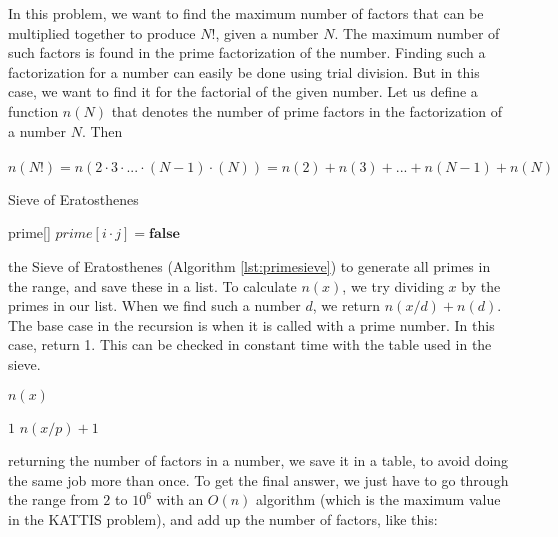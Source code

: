 \documentclass[11pt,a4paper,twoside]{article}
\begin{document}
In this problem, we want to find the maximum number of factors that can be
multiplied together to produce $N!$, given a number $N$.  The maximum number of
such factors is found in the prime factorization of the number. Finding such a
factorization for a number can easily be done using trial division. But in this
case, we want to find it for the factorial of the given number.  Let us define
a function $n(N)$ that denotes the number of prime factors in the factorization
of a number $N$. Then
\\\\
$n(N!) = n(2 \cdot 3 \cdot ... \cdot (N-1) \cdot (N)) = n(2) + n(3) + ... + n(N-1) + n(N)$
\\
\begin{algorithm}
    \caption{Sieve of Eratosthenes}
    \label{lst:primesieve}
    \begin{algorithmic}
        \STATE prime[] 
                    \STATE $prime[i \cdot j] = \textbf{false}$
                \ENDFOR
            \ENDIF
        \ENDFOR
    \end{algorithmic}
\end{algorithm}
            
 the Sieve of Eratosthenes (Algorithm \ref{lst:primesieve}) to
generate all primes in the range, and save these in a list. To calculate
$n(x)$, we try dividing $x$ by the primes in our list. When we find such a
number $d$, we return $n(x/d) + n(d)$. The base case in the recursion is when
it is called with a prime number. In this case, return 1.  This can be checked
in constant time with the table used in the sieve.


\begin{algorithm}
    \caption{$n(x)$}
    \label{lst:nx}
    \begin{algorithmic}
            \RETURN $1$
        \ENDIF
                \RETURN $n(x/p) + 1$
            \ENDIF
        \ENDFOR
    \end{algorithmic}
\end{algorithm}
    
 returning the number of factors in a number, we save it in a
table, to avoid doing the same job more than once. To get the final answer, we
just have to go through the range from $2$ to $10^6$ with an $O(n)$ algorithm
(which is the maximum value in the KATTIS problem), and add up the number of
factors, like this:
\end{document}
